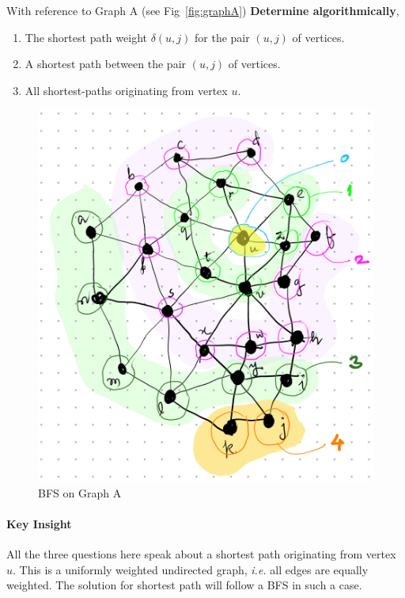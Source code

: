 \documentclass[11pt]{article}
\begin{document}
With reference to Graph A (see
Fig~\ref{fig:graphA}) \textbf{Determine algorithmically},

\begin{enumerate}
\item The shortest path weight \(\delta(u,j)\) for the pair
\((u,j)\) of vertices.
\item A shortest path between the pair \((u,j)\) of
vertices.
\item All shortest-paths originating from vertex \(u\).
\end{enumerate}

\begin{figure}[htbp]
\centering
\includegraphics[width=\linewidth]{images/bfsOnGraphA.png}
\caption{\label{fig:bfsOnGraphA}BFS on Graph A}
\end{figure}
\paragraph*{Key Insight}
\label{sec:orgda76ea4}
All the three questions here speak about a shortest
path originating from vertex \(u\).  This is a uniformly
weighted undirected graph, \emph{i.e.} all edges are equally
weighted.  The solution for shortest path will follow a
BFS in such a case.
\end{document}
